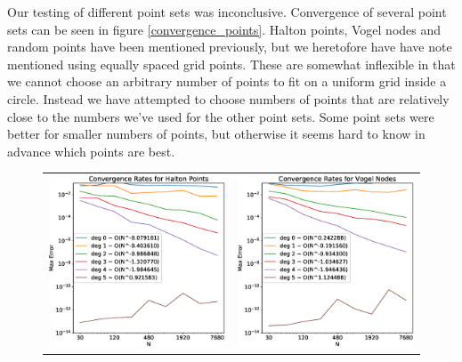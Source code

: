 \documentclass[12pt]{article}
\begin{document}
	Our testing of different point sets was inconclusive. Convergence of several point sets can be seen in figure \ref{convergence_points}. Halton points, Vogel nodes and random points have been mentioned previously, but we heretofore have have note mentioned using equally spaced grid points. These are somewhat inflexible in that we cannot choose an arbitrary number of points to fit on a uniform grid inside a circle. Instead we have attempted to choose numbers of points that are relatively close to the numbers we've used for the other point sets. Some point sets were better for smaller numbers of points, but otherwise it seems hard to know in advance which points are best.
	\begin{figure}
		\centering
		\begin{tabular}{cc}
			\includegraphics[width=.5\textwidth]{Convergence_halton.eps} & \includegraphics[width=.5\textwidth]{convergence_vogel.eps} \\

\end{tabular}
\end{figure}
\end{document}
